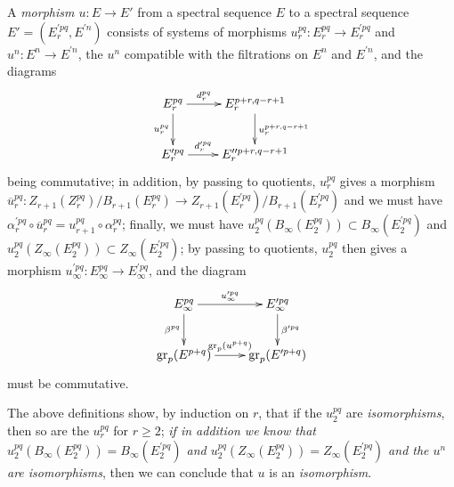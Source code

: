 \begin{env}[11.1.2]
\label{0.11.1.2}
A \emph{morphism $u:E\to E'$} from a spectral sequence $E$ to a spectral sequence $E'=(E_r^{\prime pq},E^{\prime n})$ consists of systems of morphisms $u_r^{pq}:E_r^{pq}\to E_r^{\prime pq}$ and $u^n:E^n\to E^{\prime n}$, the $u^n$ compatible with the filtrations on $E^n$ and $E^{\prime n}$, and the diagrams
\[
  \xymatrix{
    E_r^{pq}\ar[r]^-{d_r^{pq}}\ar[d]_{u_r^{pq}} &
    E_r^{p+r,q-r+1}\ar[d]^{u_r^{p+r,q-r+1}}\\
    E_r^{\prime pq}\ar[r]^-{d_r^{\prime pq}} &
    E_r'^{\prime p+r,q-r+1}
  }
\]
being commutative; in addition, by passing to quotients, $u_r^{pq}$ gives a morphism $\overline{u}_r^{pq}:Z_{r+1}(Z_r^{pq})/B_{r+1}(E_r^{pq})\to Z_{r+1}(E_r^{\prime pq})/B_{r+1}(E_r^{\prime pq})$ and we must have $\alpha_r^{\prime pq}\circ\overline{u}_r^{pq}=u_{r+1}^{pq}\circ\alpha_r^{pq}$; finally, we must have $u_2^{pq}(B_\infty(E_2^{pq}))\subset B_\infty(E_2^{\prime pq})$ and $u_2^{pq}(Z_\infty(E_2^{pq}))\subset Z_\infty(E_2^{\prime pq})$; by passing to quotients, $u_2^{pq}$ then gives a morphism $u_\infty^{\prime pq}:E_\infty^{pq}\to E_\infty^{\prime pq}$, and the diagram
\[
  \xymatrix{
    E_\infty^{pq}\ar[r]^-{u_\infty^{\prime pq}}\ar[d]_{\beta^{pq}} &
    E_\infty^{\prime pq}\ar[d]^{\beta^{\prime pq}}\\
    \gr_p(E^{p+q})\ar[r]^-{\gr_p(u^{p+q})} &
    \gr_p(E^{\prime p+q})
  }
\]
must be commutative.

The above definitions show, by induction on $r$, that if the $u_2^{pq}$ are \emph{isomorphisms}, then so are the $u_r^{pq}$ for $r\geq 2$; \emph{if in addition we know that $u_2^{pq}(B_\infty(E_2^{pq}))=B_\infty(E_2^{\prime pq})$ and $u_2^{pq}(Z_\infty(E_2^{pq}))=Z_\infty(E_2^{\prime pq})$ and the $u^n$ are isomorphisms}, then we can conclude that $u$ is an \emph{isomorphism}.
\end{env}

